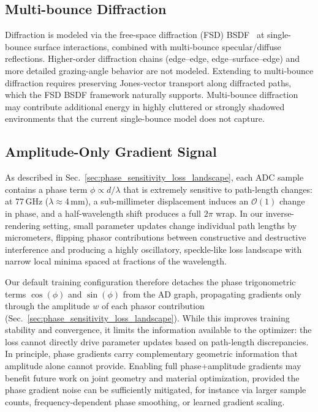 \subsection{Multi-bounce Diffraction}

Diffraction is modeled via the free-space diffraction (FSD) BSDF~\cite{steinberg2024fsd} at single-bounce surface interactions, combined with multi-bounce specular/diffuse reflections. Higher-order diffraction chains (edge--edge, edge--surface--edge) and more detailed grazing-angle behavior are not modeled. Extending to multi-bounce diffraction requires preserving Jones-vector transport along diffracted paths, which the FSD BSDF framework naturally supports. Multi-bounce diffraction may contribute additional energy in highly cluttered or strongly shadowed environments that the current single-bounce model does not capture.

\subsection{Amplitude-Only Gradient Signal}
\label{sec:lim_amplitude_only}

As described in Sec.~\ref{sec:phase_sensitivity_loss_landscape}, each ADC sample contains a phase term $\phi \propto d/\lambda$ that is extremely sensitive to path-length changes: at 77\,GHz ($\lambda \approx 4$\,mm), a sub-millimeter displacement induces an $\mathcal{O}(1)$ change in phase, and a half-wavelength shift produces a full $2\pi$ wrap. In our inverse-rendering setting, small parameter updates change individual path lengths by micrometers, flipping phasor contributions between constructive and destructive interference and producing a highly oscillatory, speckle-like loss landscape with narrow local minima spaced at fractions of the wavelength.

Our default training configuration therefore detaches the phase trigonometric terms $\cos(\phi)$ and $\sin(\phi)$ from the AD graph, propagating gradients only through the amplitude $w$ of each phasor contribution (Sec.~\ref{sec:phase_sensitivity_loss_landscape}). While this improves training stability and convergence, it limits the information available to the optimizer: the loss cannot directly drive parameter updates based on path-length discrepancies. In principle, phase gradients carry complementary geometric information that amplitude alone cannot provide. Enabling full phase+amplitude gradients may benefit future work on joint geometry and material optimization, provided the phase gradient noise can be sufficiently mitigated, for instance via larger sample counts, frequency-dependent phase smoothing, or learned gradient scaling.

